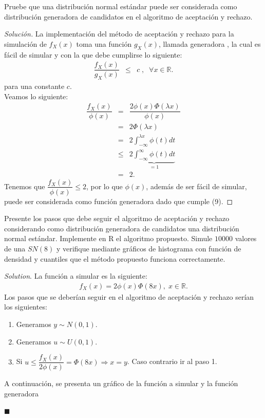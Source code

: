 \documentclass[11pt]{article}
\renewcommand{\=}[1]{\stackrel{#1}{=}} %
\newenvironment{sol}
{\begin{proof}[Solución]}
	{\end{proof}}
\theoremstyle{definition}
\theoremstyle{remark}
\newenvironment{solution}{%
\begin{trivlist} \item \textit{Solution}. }{%
\hspace*{\fill} $\blacksquare$\end{trivlist}}
\begin{document}
\begin{itemize}
	\item[a)] Pruebe que una distribución normal estándar puede ser considerada como distribución generadora
	de candidatos en el algoritmo de aceptación y rechazo.
	\begin{sol}
		La implementación del método de aceptación y rechazo para la simulación de $f_X(x)$ toma una función $g_X(x)$, llamada generadora , la cual es fácil de simular y con la que debe cumplirse lo siguiente:
		\begin{eqnarray}
		\dfrac{f_X(x)}{g_X(x)}&\leq &c \;,\;\;\forall x\in\mathbb{R}.
		\end{eqnarray}
		para una constante $c$.\\
		Veamos lo siguiente:
		\begin{eqnarray}
		\dfrac{f_X(x)}{\phi(x)} &=& \dfrac{2\phi(x)\Phi(\lambda x)}{\phi(x)}\nonumber\\
		&=& 2\Phi(\lambda x)\nonumber\\
		&=& 2\int_{-\infty}^{\lambda x}\phi(t)dt\nonumber\\
		&\leq& 2\underbrace{\int_{-\infty}^{\infty}\phi(t)dt}_{=1}\nonumber\\
		&=&2.
		\end{eqnarray}
		Tenemos que $\dfrac{f_X(x)}{\phi(x)}\leq 2$, por lo que $\phi(x)$, además de ser fácil de simular, puede ser considerada como función generadora dado que cumple (9).
	\end{sol}
\newpage
	\item[b)] Presente los pasos que debe seguir el algoritmo de aceptación y rechazo considerando como distribución generadora de candidatos una distribución normal estándar. Implemente en R el algoritmo
	propuesto. Simule $10000$ valores de una $SN(8)$ y 
	verifique mediante gráficos de histograma con
	función de densidad y cuantiles que el método propuesto funciona correctamente.
	\begin{solution}
		La función a simular es la siguiente:
		\begin{eqnarray}
		f_X(x)=2\phi(x)\Phi(8x),\;x\in\mathbb{R}.
		\end{eqnarray}
		Los pasos que se deberían seguir en el algoritmo de aceptación y rechazo serían los siguientes:
		\begin{enumerate}
			\item[1)] Generamos $y\sim N(0,1)$.
			\item[2)] Generamos $u\sim U(0,1)$.
			\item[3)] Si $u\leq \dfrac{f_X(x)}{2\phi(x)} = \Phi(8x)\Rightarrow x=y$. Caso contrario ir al paso 1.
		\end{enumerate}
	A continuación, se presenta un gráfico de la función a simular y la función generadora
	

\end{solution}
\end{itemize}
\end{document}
